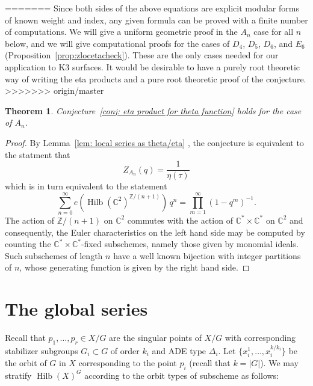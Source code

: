 \documentclass{article}
\newtheorem{theorem}{Theorem}[section]
\theoremstyle{definition}
\newcommand{\CC} {{\mathbb C}}          %
\newcommand{\ZZ} {{\mathbb Z}}		%
\newcommand{\Hilb}{\operatorname{Hilb}}
\begin{document}
=======
Since both sides of the above equations are explicit modular forms of known
weight and index, any given formula can be proved with a finite number
of computations. We will give a uniform geometric proof in the $A_{n}$ case for
all $n$ below, and we will give computational proofs for the cases of
$D_{4}$, $D_{5}$, $D_{6}$, and $E_{6}$ (Proposition~\ref{prop:zlocetacheck}). These are the only cases needed for our application to K3 surfaces. It would be desirable to have a
purely root theoretic way of writing the eta products and a pure root
theoretic proof of the conjecture. 
>>>>>>> origin/master

\begin{theorem}\label{thm: conjecture holds for An}
Conjecture~\ref{conj: eta product for theta function} holds for the
case of $A_{n}$. 
\end{theorem}

\begin{proof}
By Lemma~\ref{lem: local series as theta/eta} , the conjecture is
equivalent to the statment that 
\[
Z_{A_{n}}(q) = \frac{1}{\eta (\tau )}
\]
which is in turn equivalent to the statement
\[
\sum_{n=0}^{\infty} e\left(\Hilb (\CC^{2})^{\ZZ /(n+1)} \right)
\,q^{n} = \prod_{m=1}^{\infty} (1-q^{m})^{-1}.
\]
The action of $\ZZ /(n+1)$ on $\CC^{2}$ commutes with the action of
$\CC^{*}\times \CC^{*}$ on $\CC^{2}$ and consequently, the Euler
characteristics on the left hand side may be computed by counting
the $\CC^{*}\times \CC^{*}$-fixed subschemes, namely those given by
monomial ideals. Such subschemes of length $n$ have a well known
bijection with integer partitions of $n$, whose generating function is
given by the right hand side.
\end{proof}



\section{The global series}\label{sec: the global series}

Recall that $p_{1},\dotsc ,p_{r}\in X/G$ are the singular points of
$X/G$ with corresponding stabilizer subgroups $G_{i}\subset G$ of
order $k_{i}$ and ADE type $\Delta_{i}$. Let $\{x_{i}^{1},\dotsc
,x_{i}^{k/k_{i}} \}$ be the orbit of $G$ in $X$ corresponding to the
point $p_{i}$ (recall that $k=|G|$).  We may stratify $\Hilb (X)^{G}$
according to the orbit types of subscheme as follows:
\end{document}
